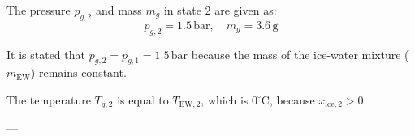 The pressure \( p_{g,2} \) and mass \( m_g \) in state 2 are given as:  
\[
p_{g,2} = 1.5 \, \text{bar}, \quad m_g = 3.6 \, \text{g}
\]  

It is stated that \( p_{g,2} = p_{g,1} = 1.5 \, \text{bar} \) because the mass of the ice-water mixture (\( m_{\text{EW}} \)) remains constant.  

The temperature \( T_{g,2} \) is equal to \( T_{\text{EW},2} \), which is \( 0^\circ\text{C} \), because \( x_{\text{ice},2} > 0 \).  

---